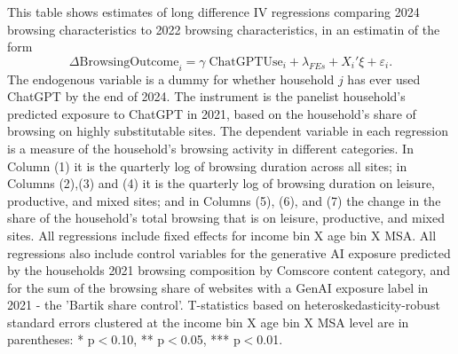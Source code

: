 \documentclass[12pt]{article}
\begin{document}
\begin{table}[htbp]
\caption{\\ \centering \textbf{Effect of ChatGPT adoption on browsing activity by Income}}  

\setlength{\abovedisplayskip}{0pt}
\setlength{\belowdisplayskip}{0.5pt}
\setlength{\abovedisplayshortskip}{0pt}
\setlength{\belowdisplayshortskip}{0.5pt}
\vspace{-0.1cm} \label{table:2sls-bycat-byinc} \footnotesize  This table shows estimates of long difference IV regressions comparing 2024 browsing characteristics to 2022 browsing characteristics, in an estimatin of the form
$$\Delta\text{BrowsingOutcome}_{i} = \gamma\; \text{ChatGPTUse}_{i}  + \lambda_{FEs} + X_i'\xi + \varepsilon_{i}.$$
The endogenous variable is a dummy for whether household $j$ has ever used ChatGPT by the end of 2024. The instrument is the panelist household's predicted exposure to ChatGPT in 2021, based on the household's share of browsing on highly substitutable sites. The dependent variable in each regression is a measure of the household's browsing activity in different categories. In Column (1) it is the quarterly log of browsing duration across all sites; in Columns (2),(3) and (4) it is the quarterly log of browsing duration on  leisure, productive, and mixed sites; and in Columns (5), (6), and (7) the change in the share of the household's total browsing that is  on  leisure, productive, and mixed sites. All regressions include fixed effects for income bin X age bin X MSA. All regressions also include control variables for the generative AI exposure predicted by the households 2021 browsing composition by Comscore content category, and for the sum of the browsing share of websites with a GenAI exposure label in 2021 - the 'Bartik share control'. T-statistics based on heteroskedasticity-robust standard errors clustered at the income bin X age bin X MSA level are in parentheses: * p$<$0.10, ** p$<$0.05, *** p$<$0.01.  \vspace{0.1cm}


\end{table}
\end{document}
